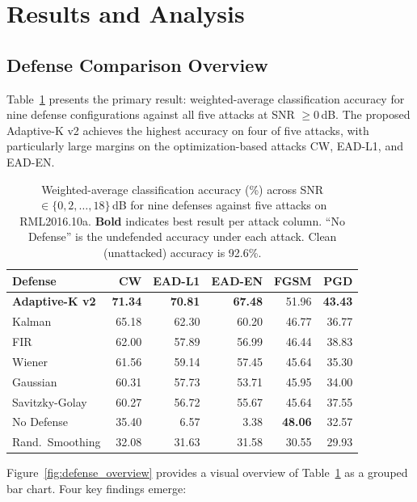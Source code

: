 \section{Results and Analysis}
\label{sec:results}

\subsection{Defense Comparison Overview}

Table~\ref{tab:main} presents the primary result: weighted-average classification
accuracy for nine defense configurations against all five attacks at SNR
$\geq 0$\,dB.  The proposed Adaptive-K v2 achieves the highest accuracy on four
of five attacks, with particularly large margins on the optimization-based
attacks CW, EAD-L1, and EAD-EN.

\begin{table}[t]
\caption{Weighted-average classification accuracy (\%) across SNR $\in \{0, 2,
  \ldots, 18\}$\,dB for nine defenses against five attacks on RML2016.10a.
  \textbf{Bold} indicates best result per attack column.  ``No Defense'' is the
  undefended accuracy under each attack.  Clean (unattacked) accuracy is 92.6\%.}
\label{tab:main}
\centering
\begin{tabular}{lrrrrr}
\toprule
Defense         & CW     & EAD-L1 & EAD-EN & FGSM   & PGD    \\
\midrule
\textbf{Adaptive-K v2}  & \textbf{71.34} & \textbf{70.81} & \textbf{67.48} & 51.96  & \textbf{43.43} \\
\midrule
Kalman          & 65.18 & 62.30  & 60.20  & 46.77  & 36.77  \\
FIR             & 62.00 & 57.89  & 56.99  & 46.44  & 38.83  \\
Wiener          & 61.56 & 59.14  & 57.45  & 45.64  & 35.30  \\
Gaussian        & 60.31 & 57.73  & 53.71  & 45.95  & 34.00  \\
Savitzky-Golay  & 60.27 & 56.72  & 55.67  & 45.64  & 37.55  \\
\midrule
No Defense      & 35.40 &  6.57  &  3.38  & \textbf{48.06}  & 32.57  \\
\midrule
Rand.\ Smoothing & 32.08 & 31.63  & 31.58  & 30.55  & 29.93  \\
\bottomrule
\end{tabular}
\end{table}

Figure~\ref{fig:defense_overview} provides a visual overview of Table~\ref{tab:main}
as a grouped bar chart.  Four key findings emerge:

